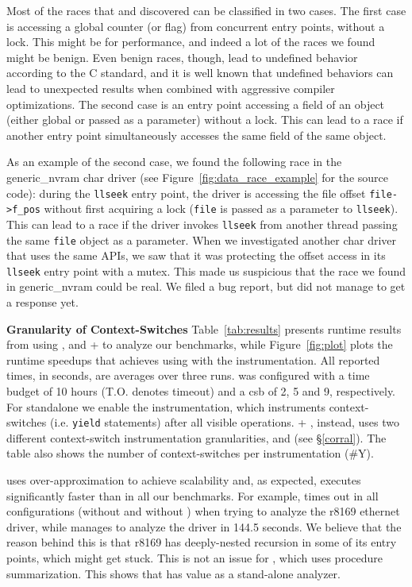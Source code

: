 Most of the races that \whoop and \corral discovered can be classified in two cases. The first case is accessing a global counter (or flag) from concurrent entry points, without a lock. This might be for performance, and indeed a lot of the races we found might be benign. Even benign races, though, lead to undefined behavior according to the C standard, and it is well known that undefined behaviors can lead to unexpected results when combined with aggressive compiler optimizations. The second case is an entry point accessing a field of an object (either global or passed as a parameter) without a lock. This can lead to a race if another entry point simultaneously accesses the same field of the same object.

As an example of the second case, we found the following race in the generic\_nvram char driver (see Figure~\ref{fig:data_race_example} for the source code): during the \texttt{llseek} entry point, the driver is accessing the file offset \texttt{file->f\_pos} without first acquiring a lock (\texttt{file} is passed as a parameter to \texttt{llseek}). This can lead to a race if the driver invokes \texttt{llseek} from another thread passing the same \texttt{file} object as a parameter. When we investigated another char driver that uses the same APIs, we saw that it was protecting the offset access in its \texttt{llseek} entry point with a mutex. This made us suspicious that the race we found in generic\_nvram could be real. We filed a bug report, but did not manage to get a response yet.

\noindent\textbf{Granularity of Context-Switches }
%
Table~\ref{tab:results} presents runtime results from using \whoop, \corral and \whoop + \corral to analyze our benchmarks, while Figure~\ref{fig:plot} plots the runtime speedups that \corral achieves using \whoop with the \yieldmr instrumentation. All reported times, in seconds, are averages over three runs. \corral was configured with a time budget of 10 hours (T.O. denotes timeout) and a csb of 2, 5 and 9, respectively. For standalone \corral we enable the \yieldall instrumentation, which instruments context-switches (i.e. \texttt{yield} statements) after all visible operations. \whoop + \corral, instead, uses two different context-switch instrumentation granularities, \yieldcoarse and \yieldmr (see \S\ref{corral}). The table also shows the number of context-switches per instrumentation (\#Y).

\whoop uses over-approximation to achieve scalability and, as expected, executes significantly faster than \corral in all our benchmarks. For example, \corral times out in all configurations (without and without \whoop) when trying to analyze the r8169 ethernet driver, while \whoop manages to analyze the driver in 144.5 seconds. We believe that the reason behind this is that r8169 has deeply-nested recursion in some of its entry points, which might get \corral stuck. This is not an issue for \whoop, which uses procedure summarization. This shows that \whoop has value as a stand-alone analyzer.

